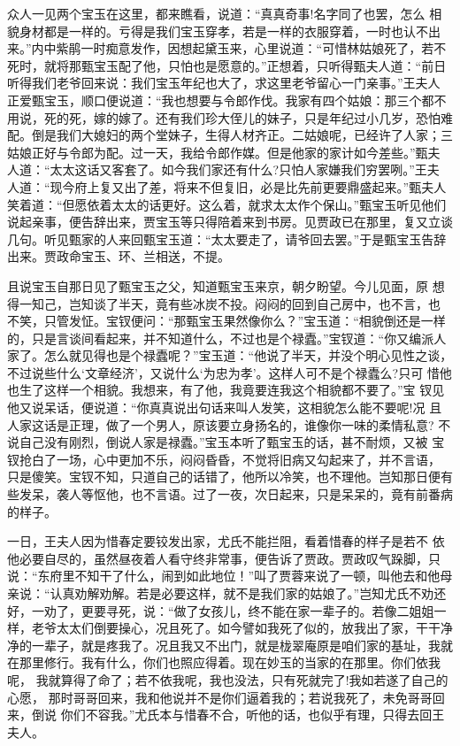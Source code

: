 众人一见两个宝玉在这里，都来瞧看，说道：“真真奇事!名字同了也罢，怎么
相貌身材都是一样的。亏得是我们宝玉穿孝，若是一样的衣服穿着，一时也认不出
来。”内中紫鹃一时痴意发作，因想起黛玉来，心里说道：“可惜林姑娘死了，若不
死时，就将那甄宝玉配了他，只怕也是愿意的。”正想着，只听得甄夫人道：“前日
听得我们老爷回来说：我们宝玉年纪也大了，求这里老爷留心一门亲事。”王夫人
正爱甄宝玉，顺口便说道：“我也想要与令郎作伐。我家有四个姑娘：那三个都不
用说，死的死，嫁的嫁了。还有我们珍大侄儿的妹子，只是年纪过小几岁，恐怕难
配。倒是我们大媳妇的两个堂妹子，生得人材齐正。二姑娘呢，已经许了人家；三
姑娘正好与令郎为配。过一天，我给令郎作媒。但是他家的家计如今差些。”甄夫
人道：“太太这话又客套了。如今我们家还有什么?只怕人家嫌我们穷罢咧。”王夫
人道：“现今府上复又出了差，将来不但复旧，必是比先前更要鼎盛起来。”甄夫人
笑着道：“但愿依着太太的话更好。这么着，就求太太作个保山。”甄宝玉听见他们
说起亲事，便告辞出来，贾宝玉等只得陪着来到书房。见贾政已在那里，复又立谈
几句。听见甄家的人来回甄宝玉道：“太太要走了，请爷回去罢。”于是甄宝玉告辞
出来。贾政命宝玉、环、兰相送，不提。

且说宝玉自那日见了甄宝玉之父，知道甄宝玉来京，朝夕盼望。今儿见面，原
想得一知己，岂知谈了半天，竟有些冰炭不投。闷闷的回到自己房中，也不言，也
不笑，只管发怔。宝钗便问：“那甄宝玉果然像你么？”宝玉道：“相貌倒还是一样
的，只是言谈间看起来，并不知道什么，不过也是个禄蠹。”宝钗道：“你又编派人
家了。怎么就见得也是个禄蠹呢？”宝玉道：“他说了半天，并没个明心见性之谈，
不过说些什么‘文章经济’，又说什么‘为忠为孝’。这样人可不是个禄蠹么?只可
惜他也生了这样一个相貌。我想来，有了他，我竟要连我这个相貌都不要了。”宝
钗见他又说呆话，便说道：“你真真说出句话来叫人发笑，这相貌怎么能不要呢!况
且人家这话是正理，做了一个男人，原该要立身扬名的，谁像你一味的柔情私意?
不说自己没有刚烈，倒说人家是禄蠹。”宝玉本听了甄宝玉的话，甚不耐烦，又被
宝钗抢白了一场，心中更加不乐，闷闷昏昏，不觉将旧病又勾起来了，并不言语，
只是傻笑。宝钗不知，只道自己的话错了，他所以冷笑，也不理他。岂知那日便有
些发呆，袭人等怄他，也不言语。过了一夜，次日起来，只是呆呆的，竟有前番病
的样子。

一日，王夫人因为惜春定要铰发出家，尤氏不能拦阻，看着惜春的样子是若不
依他必要自尽的，虽然昼夜着人看守终非常事，便告诉了贾政。贾政叹气跺脚，只
说：“东府里不知干了什么，闹到如此地位！”叫了贾蓉来说了一顿，叫他去和他母
亲说：“认真劝解劝解。若是必要这样，就不是我们家的姑娘了。”岂知尤氏不劝还
好，一劝了，更要寻死，说：“做了女孩儿，终不能在家一辈子的。若像二姐姐一
样，老爷太太们倒要操心，况且死了。如今譬如我死了似的，放我出了家，干干净
净的一辈子，就是疼我了。况且我又不出门，就是栊翠庵原是咱们家的基址，我就
在那里修行。我有什么，你们也照应得着。现在妙玉的当家的在那里。你们依我呢，
我就算得了命了；若不依我呢，我也没法，只有死就完了!我如若遂了自己的心愿，
那时哥哥回来，我和他说并不是你们逼着我的；若说我死了，未免哥哥回来，倒说
你们不容我。”尤氏本与惜春不合，听他的话，也似乎有理，只得去回王夫人。

